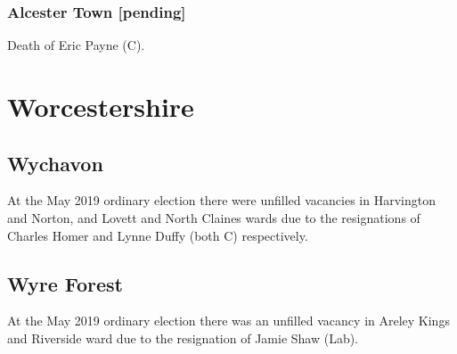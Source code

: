 \documentclass[a4paper,openany]{book}
\begin{document}
\begin{resultsiii}
\subsubsection*{Alcester Town \hspace*{\fill}\nolinebreak[1]%
	\enspace\hspace*{\fill}
	[pending]}


Death of Eric Payne (C).

\section{Worcestershire}

\subsection*{Wychavon}

At the May 2019 ordinary election there were unfilled vacancies in Harvington and Norton, and Lovett and North Claines wards due to the resignations of Charles Homer and Lynne Duffy (both C) respectively.

\subsection*{Wyre Forest}

At the May 2019 ordinary election there was an unfilled vacancy in Areley Kings and Riverside ward due to the resignation of Jamie Shaw (Lab).


\end{resultsiii}
\end{document}
